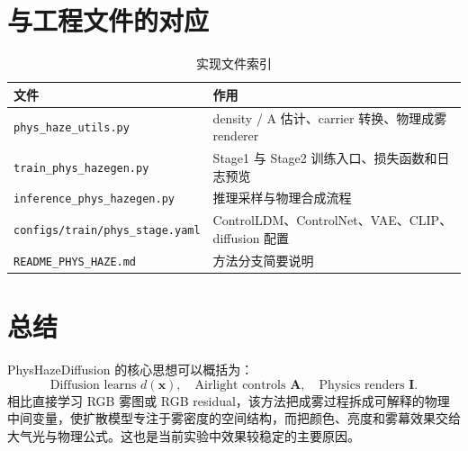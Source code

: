 \documentclass[11pt,a4paper]{ctexart}
\begin{document}
\section{与工程文件的对应}

\begin{table}[h]
\centering
\caption{实现文件索引}
\begin{tabular}{ll}
\toprule
文件 & 作用 \\
\midrule
\texttt{phys\_haze\_utils.py} & density / A 估计、carrier 转换、物理成雾 renderer \\
\texttt{train\_phys\_hazegen.py} & Stage1 与 Stage2 训练入口、损失函数和日志预览 \\
\texttt{inference\_phys\_hazegen.py} & 推理采样与物理合成流程 \\
\texttt{configs/train/phys\_stage.yaml} & ControlLDM、ControlNet、VAE、CLIP、diffusion 配置 \\
\texttt{README\_PHYS\_HAZE.md} & 方法分支简要说明 \\
\bottomrule
\end{tabular}
\end{table}

\section{总结}

PhysHazeDiffusion 的核心思想可以概括为：
\[
  \boxed{
    \text{Diffusion learns } d(\bm{x}),\quad
    \text{Airlight controls } \bm{A},\quad
    \text{Physics renders } \bm{I}.
  }
\]
相比直接学习 RGB 雾图或 RGB residual，该方法把成雾过程拆成可解释的物理中间变量，使扩散模型专注于雾密度的空间结构，而把颜色、亮度和雾幕效果交给大气光与物理公式。这也是当前实验中效果较稳定的主要原因。
\end{document}
